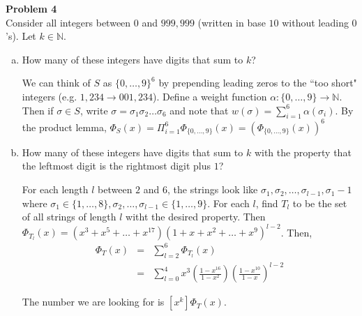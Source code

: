 \documentclass{article}
\begin{document}
\textbf{Problem 4}\\
Consider all integers between $0$ and $999,999$ (written in base $10$ without leading $0$'s). Let $k \in \mathbb{N}$. 
\begin{enumerate}[a)]
	\item How many of these integers have digits that sum to $k$?
	
	We can think of $S$ as $\{0, \dots, 9 \}^6$ by prepending leading zeros to the ``too short" integers (e.g. $1,234 \rightarrow 001,234$). Define a weight function $\alpha : \{0, \dots, 9\} \rightarrow \mathbb{N}$. Then if $\sigma \in S$, write $\sigma = \sigma_1 \sigma_2 \dots \sigma_6$ and note that $w(\sigma) = \sum_{i = 1}^6 \alpha(\sigma_i)$. By the product lemma, $\Phi_S(x) = \Pi_{i=1}^6 \Phi_{\{0, \dots, 9 \}}(x) = \left( \Phi_{\{0, \dots, 9 \}}(x)\right)^6$


\item How many of these integers have digits that sum to $k$ with the property that the leftmost digit is the rightmost digit plus $1$?

For each length $l$ between $2$ and $6$, the strings look like $\sigma_1, \sigma_2, \dots , \sigma_{l-1}, \sigma_1-1$ where $\sigma_1 \in \{1, \dots, 8\}, \sigma_2, \dots , \sigma_{l-1} \in \{1, \dots , 9\}$. For each $l$, find $T_l$ to be the set of all strings of length $l$ witht the desired property. Then $\Phi_{T_l}(x) = (x^3 + x^5 + \dots + x^{17})(1+x+x^2+ \dots + x^9)^{l-2}$. Then, 
\begin{eqnarray*}
	\Phi_{T}(x) &=& \sum_{l=2}^6 \Phi_{T_l}(x)\\
	&=& \sum_{l=0}^4 x^3 \left( \frac{1-x^{16}}{1-x^2} \right) \left( \frac{1-x^{10}}{1-x} \right)^{l-2} 
\end{eqnarray*}

The number we are looking for is $[x^k]\Phi_T(x)$.

\end{enumerate}
\end{document}
